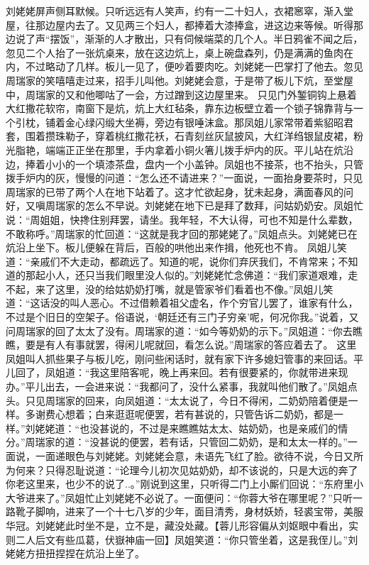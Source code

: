 \documentclass[12pt,oneside]{book}
\begin{document}
刘姥姥屏声侧耳默候。只听远远有人笑声，约有一二十妇人，衣裙窸窣，渐入堂屋，往那边屋内去了。又见两三个妇人，都捧着大漆捧盒，进这边来等候。听得那边说了声“摆饭”，渐渐的人才散出，只有伺候端菜的几个人。半日鸦雀不闻之后，忽见二个人抬了一张炕桌来，放在这边炕上，桌上碗盘森列，仍是满满的鱼肉在内，不过略动了几样。板儿一见了，便吵着要肉吃。刘姥姥一巴掌打了他去。忽见周瑞家的笑嘻嘻走过来，招手儿叫他。刘姥姥会意，于是带了板儿下炕，至堂屋中，周瑞家的又和他唧咕了一会，方过蹭到这边屋里来。
只见门外錾铜钩上悬着大红撒花软帘，南窗下是炕，炕上大红毡条，靠东边板壁立着一个锁子锦靠背与一个引枕，铺着金心绿闪缎大坐褥，旁边有银唾沫盒。那凤姐儿家常带着紫貂昭君套，围着攒珠勒子，穿着桃红撒花袄，石青刻丝灰鼠披风，大红洋绉银鼠皮裙，粉光脂艳，端端正正坐在那里，手内拿着小铜火箸儿拨手炉内的灰。平儿站在炕沿边，捧着小小的一个填漆茶盘，盘内一个小盖钟。凤姐也不接茶，也不抬头，只管拨手炉内的灰，慢慢的问道：“怎么还不请进来？”一面说，一面抬身要茶时，只见周瑞家的已带了两个人在地下站着了。这才忙欲起身，犹未起身，满面春风的问好，又嗔周瑞家的怎么不早说。刘姥姥在地下已是拜了数拜，问姑奶奶安。凤姐忙说：“周姐姐，快搀住别拜罢，请坐。我年轻，不大认得，可也不知是什么辈数，不敢称呼。”周瑞家的忙回道：“这就是我才回的那姥姥了。”凤姐点头。刘姥姥已在炕沿上坐下。板儿便躲在背后，百般的哄他出来作揖，他死也不肯。
凤姐儿笑道：“亲戚们不大走动，都疏远了。知道的呢，说你们弃厌我们，不肯常来；不知道的那起小人，还只当我们眼里没人似的。”刘姥姥忙念佛道：“我们家道艰难，走不起，来了这里，没的给姑奶奶打嘴，就是管家爷们看着也不像。”凤姐儿笑道：“这话没的叫人恶心。不过借赖着祖父虚名，作个穷官儿罢了，谁家有什么，不过是个旧日的空架子。俗语说，‘朝廷还有三门子穷亲’呢，何况你我。”说着，又问周瑞家的回了太太了没有。周瑞家的道：“如今等奶奶的示下。”凤姐道：“你去瞧瞧，要是有人有事就罢，得闲儿呢就回，看怎么说。”周瑞家的答应着去了。
这里凤姐叫人抓些果子与板儿吃，刚问些闲话时，就有家下许多媳妇管事的来回话。平儿回了，凤姐道：“我这里陪客呢，晚上再来回。若有很要紧的，你就带进来现办。”平儿出去，一会进来说：“我都问了，没什么紧事，我就叫他们散了。”凤姐点头。只见周瑞家的回来，向凤姐道：“太太说了，今日不得闲，二奶奶陪着便是一样。多谢费心想着；白来逛逛呢便罢，若有甚说的，只管告诉二奶奶，都是一样。”刘姥姥道：“也没甚说的，不过是来瞧瞧姑太太、姑奶奶，也是亲戚们的情分。”周瑞家的道：“没甚说的便罢，若有话，只管回二奶奶，是和太太一样的。”一面说，一面递眼色与刘姥姥。刘姥姥会意，未语先飞红了脸。欲待不说，今日又所为何来？只得忍耻说道：“论理今儿初次见姑奶奶，却不该说的，只是大远的奔了你老这里来，也少不的说了..。”刚说到这里，只听得二门上小厮们回说：“东府里小大爷进来了。”凤姐忙止刘姥姥不必说了。一面便问：“你蓉大爷在哪里呢？”只听一路靴子脚响，进来了一个十七八岁的少年，面目清秀，身材妖娇，轻裘宝带，美服华冠。刘姥姥此时坐不是，立不是，藏没处藏。【蓉儿形容偏从刘妪眼中看出，实则二人后文有些瓜葛，伏嶽神庙一回】凤姐笑道：“你只管坐着，这是我侄儿。”刘姥姥方扭扭捏捏在炕沿上坐了。
\end{document}
